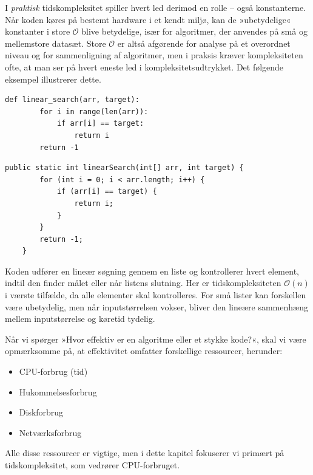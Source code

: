 I \textit{praktisk} tidskompleksitet spiller hvert led derimod en rolle -- også konstanterne. Når koden køres på bestemt hardware i et kendt miljø, kan de »ubetydelige« konstanter i store $\mathcal{O}$ blive betydelige, især for algoritmer, der anvendes på små og mellemstore datasæt. Store $\mathcal{O}$ er altså afgørende for analyse på et overordnet niveau og for sammenligning af algoritmer, men i praksis kræver kompleksiteten ofte, at man ser på hvert eneste led i kompleksitetsudtrykket. Det følgende eksempel illustrerer dette.

\begin{lstlisting}[style=pythonStyle, caption={Lineær søgning i Python}, label={lst:python_linear_search}]
    def linear_search(arr, target):
        for i in range(len(arr)):
            if arr[i] == target:
                return i
        return -1
\end{lstlisting} \newpage
    
\begin{lstlisting}[style=javaStyle, caption={Lineær søgning i Java}, label={lst:java_linear_search}]
    public static int linearSearch(int[] arr, int target) {
        for (int i = 0; i < arr.length; i++) {
            if (arr[i] == target) {
                return i;
            }
        }
        return -1;
    }
\end{lstlisting}

Koden udfører en lineær søgning gennem en liste og kontrollerer hvert element, indtil den finder målet eller når listens slutning. Her er tidskompleksiteten $\mathcal{O}(n)$ i værste tilfælde, da alle elementer skal kontrolleres. For små lister kan forskellen være ubetydelig, men når inputstørrelsen vokser, bliver den lineære sammenhæng mellem inputstørrelse og køretid tydelig.

Når vi spørger »Hvor effektiv er en algoritme eller et stykke kode?«, skal vi være opmærksomme på, at effektivitet omfatter forskellige ressourcer, herunder:
\begin{itemize}
    \item CPU-forbrug (tid)
    \item Hukommelsesforbrug
    \item Diskforbrug
    \item Netværksforbrug
\end{itemize}

Alle disse ressourcer er vigtige, men i dette kapitel fokuserer vi primært på tidskompleksitet, som vedrører CPU-forbruget.

